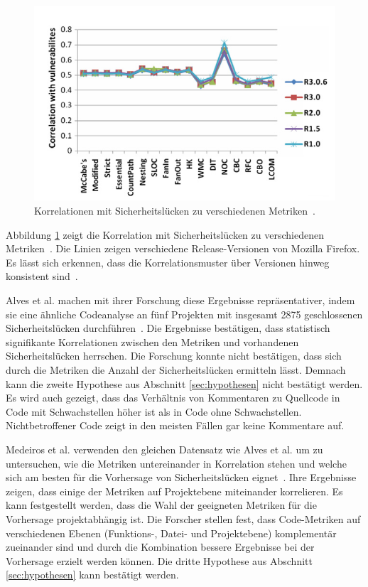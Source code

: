 \begin{figure}
	\includegraphics[width=\textwidth]{img/vulnerability_correlations.png}
	\caption{Korrelationen mit Sicherheitslücken zu verschiedenen Metriken~\cite{chowdhury_zulkernine_2009}.}
	\label{fig:correlations}
\end{figure}
Abbildung \ref{fig:correlations} zeigt die Korrelation mit Sicherheitslücken zu verschiedenen Metriken~\cite{chowdhury_zulkernine_2009}.
Die Linien zeigen verschiedene Release-Versionen von Mozilla Firefox.
Es lässt sich erkennen, dass die Korrelationsmuster über Versionen hinweg konsistent sind~\cite{chowdhury_zulkernine_2009}.

Alves et al. machen mit ihrer Forschung diese Ergebnisse repräsentativer, indem sie eine ähnliche Codeanalyse an fünf Projekten mit insgesamt 2875 geschlossenen Sicherheitslücken durchführen~\cite{alves_et_al}.
Die Ergebnisse bestätigen, dass statistisch signifikante Korrelationen zwischen den Metriken und vorhandenen Sicherheitslücken herrschen.
Die Forschung konnte nicht bestätigen, dass sich durch die Metriken die Anzahl der Sicherheitslücken ermitteln lässt.
Demnach kann die zweite Hypothese aus Abschnitt \ref{sec:hypothesen} nicht bestätigt werden.
Es wird auch gezeigt, dass das Verhältnis von Kommentaren zu Quellcode in Code mit Schwachstellen höher ist als in Code ohne Schwachstellen.
Nichtbetroffener Code zeigt in den meisten Fällen gar keine Kommentare auf.

Medeiros et al. verwenden den gleichen Datensatz wie Alves et al. um zu untersuchen, wie die Metriken untereinander in Korrelation stehen und welche sich am besten für die Vorhersage von Sicherheitslücken eignet~\cite{medeiros_et_al}.
Ihre Ergebnisse zeigen, dass einige der Metriken auf Projektebene miteinander korrelieren.
Es kann festgestellt werden, dass die Wahl der geeigneten Metriken für die Vorhersage projektabhängig ist.
Die Forscher stellen fest, dass Code-Metriken auf verschiedenen Ebenen (Funktions-, Datei- und Projektebene) komplementär zueinander sind und durch die Kombination bessere Ergebnisse bei der Vorhersage erzielt werden können.
Die dritte Hypothese aus Abschnitt \ref{sec:hypothesen} kann bestätigt werden.

